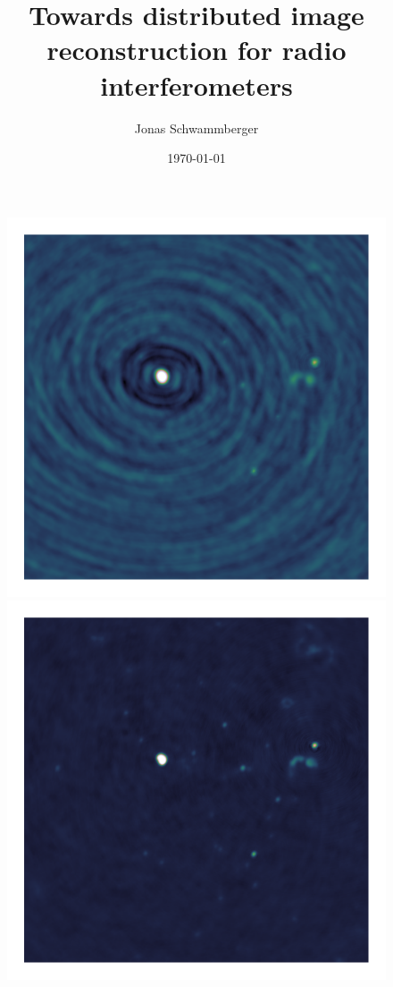 \documentclass[11pt]{article}
\numberwithin{equation}{section}
\begin{document}
\title{Towards distributed image reconstruction for radio interferometers}
\author{Jonas Schwammberger}
\date{\today}
\begin{titlepage}
	\maketitle
	
	\begin{figure}[h]
		\centering
		\includegraphics[width=0.49\linewidth, clip, trim= 0.38in 0.38in 0.38in 0.38in]{./chapters/CD-dirty.png}
		\includegraphics[width=0.49\linewidth, clip, trim= 0.38in 0.38in 0.38in 0.38in]{./chapters/CD-restored.png}
	\end{figure}
	\thispagestyle{empty}
	\setcounter{page}{0}
\end{titlepage}


\newpage
\pagestyle{abstract}


\newpage
\pagestyle{tableofcontent}
\tableofcontents  	
\newpage

\pagestyle{documentstyle}
\setcounter{page}{1}


\newpage

\newpage

\newpage

\newpage
%

\newpage

\newpage

\newpage

\newpage

\newpage


\newpage
{}
%

\newpage
\listoffigures
\listoftables

\newpage

\newpage

\newpage
\end{document}
